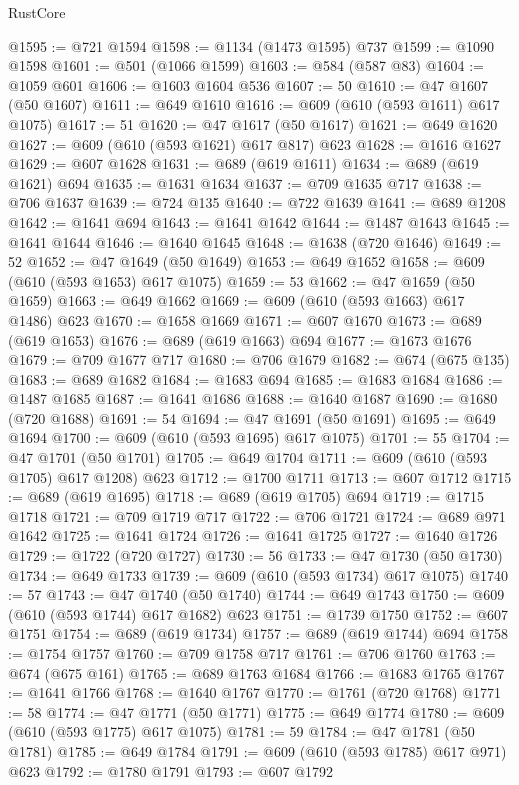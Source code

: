 \begin{lexlean}{RustCore}
\begin{coremodule}
@1595 := @721 @1594
@1598 := @1134 (@1473 @1595) @737
@1599 := @1090 @1598
@1601 := @501 (@1066 @1599)
@1603 := @584 (@587 @83)
@1604 := @1059 @601
@1606 := @1603 @1604 @536
@1607 := 50
@1610 := @47 @1607 (@50 @1607)
@1611 := @649 @1610
@1616 := @609 (@610 (@593 @1611) @617 @1075)
@1617 := 51
@1620 := @47 @1617 (@50 @1617)
@1621 := @649 @1620
@1627 := @609 (@610 (@593 @1621) @617 @817) @623
@1628 := @1616 @1627
@1629 := @607 @1628
@1631 := @689 (@619 @1611)
@1634 := @689 (@619 @1621) @694
@1635 := @1631 @1634
@1637 := @709 @1635 @717
@1638 := @706 @1637
@1639 := @724 @135
@1640 := @722 @1639
@1641 := @689 @1208
@1642 := @1641 @694
@1643 := @1641 @1642
@1644 := @1487 @1643
@1645 := @1641 @1644
@1646 := @1640 @1645
@1648 := @1638 (@720 @1646)
@1649 := 52
@1652 := @47 @1649 (@50 @1649)
@1653 := @649 @1652
@1658 := @609 (@610 (@593 @1653) @617 @1075)
@1659 := 53
@1662 := @47 @1659 (@50 @1659)
@1663 := @649 @1662
@1669 := @609 (@610 (@593 @1663) @617 @1486) @623
@1670 := @1658 @1669
@1671 := @607 @1670
@1673 := @689 (@619 @1653)
@1676 := @689 (@619 @1663) @694
@1677 := @1673 @1676
@1679 := @709 @1677 @717
@1680 := @706 @1679
@1682 := @674 (@675 @135)
@1683 := @689 @1682
@1684 := @1683 @694
@1685 := @1683 @1684
@1686 := @1487 @1685
@1687 := @1641 @1686
@1688 := @1640 @1687
@1690 := @1680 (@720 @1688)
@1691 := 54
@1694 := @47 @1691 (@50 @1691)
@1695 := @649 @1694
@1700 := @609 (@610 (@593 @1695) @617 @1075)
@1701 := 55
@1704 := @47 @1701 (@50 @1701)
@1705 := @649 @1704
@1711 := @609 (@610 (@593 @1705) @617 @1208) @623
@1712 := @1700 @1711
@1713 := @607 @1712
@1715 := @689 (@619 @1695)
@1718 := @689 (@619 @1705) @694
@1719 := @1715 @1718
@1721 := @709 @1719 @717
@1722 := @706 @1721
@1724 := @689 @971 @1642
@1725 := @1641 @1724
@1726 := @1641 @1725
@1727 := @1640 @1726
@1729 := @1722 (@720 @1727)
@1730 := 56
@1733 := @47 @1730 (@50 @1730)
@1734 := @649 @1733
@1739 := @609 (@610 (@593 @1734) @617 @1075)
@1740 := 57
@1743 := @47 @1740 (@50 @1740)
@1744 := @649 @1743
@1750 := @609 (@610 (@593 @1744) @617 @1682) @623
@1751 := @1739 @1750
@1752 := @607 @1751
@1754 := @689 (@619 @1734)
@1757 := @689 (@619 @1744) @694
@1758 := @1754 @1757
@1760 := @709 @1758 @717
@1761 := @706 @1760
@1763 := @674 (@675 @161)
@1765 := @689 @1763 @1684
@1766 := @1683 @1765
@1767 := @1641 @1766
@1768 := @1640 @1767
@1770 := @1761 (@720 @1768)
@1771 := 58
@1774 := @47 @1771 (@50 @1771)
@1775 := @649 @1774
@1780 := @609 (@610 (@593 @1775) @617 @1075)
@1781 := 59
@1784 := @47 @1781 (@50 @1781)
@1785 := @649 @1784
@1791 := @609 (@610 (@593 @1785) @617 @971) @623
@1792 := @1780 @1791
@1793 := @607 @1792

\end{coremodule}
\end{lexlean}
